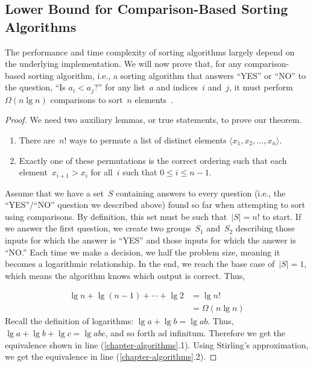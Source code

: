 \subsection{Lower Bound for Comparison-Based Sorting Algorithms}
The performance and time complexity of sorting algorithms largely depend on the underlying implementation. 
We will now prove that, for any comparison-based sorting algorithm, i.e., a sorting algorithm that answers ``YES'' or ``NO'' to the question, ``Is $a_i < a_j$?'' for any list~$a$ and indices~$i$ and~$j$, it must perform~$\Omega(n \lg n)$ comparisons to sort~$n$ elements~.

\begin{proof}
We need two auxiliary lemmas, or true statements, to prove our theorem.
\begin{enumerate}[label=(\alph*)]
  \item There are~$n!$ ways to permute a list of distinct elements $\langle{x_1, x_2, \ldots, x_n}\rangle$. 
  \item Exactly one of these permutations is the correct ordering such that each element~$x_{i+1} > x_{i}$ for all~$i$ such that $0 \leq i \leq n-1$. 
\end{enumerate}

Assume that we have a set~$S$ containing answers to every question (i.e., the ``YES''/``NO'' question we described above) found so far when attempting to sort using comparisons. 
By definition, this set must be such that~$|S|=n!$ to start. 
If we answer the first question, we create two groups~$S_1$ and~$S_2$ describing those inputs for which the answer is ``YES'' and those inputs for which the answer is ``NO.'' 
Each time we make a decision, we half the problem size, meaning it becomes a logarithmic relationship. 
In the end, we reach the base case of~$|S|=1$, which means the algorithm knows which output is correct. Thus,

\begin{align}
\lg{n} + \lg{(n-1)} + \cdots + \lg{2} &= \lg{n!}\\
        &= \Omega(n \lg n)
\end{align}
Recall the definition of logarithms: $\lg{a} + \lg{b} = \lg{ab}$. 
Thus, $\lg{a} + \lg{b} + \lg{c} = \lg{abc}$, and so forth ad infinitum. 
Therefore we get the equivalence shown in line (\ref{chapter-algorithms}.1). 
Using Stirling's approximation, we get the equivalence in line (\ref{chapter-algorithms}.2).
\end{proof}
